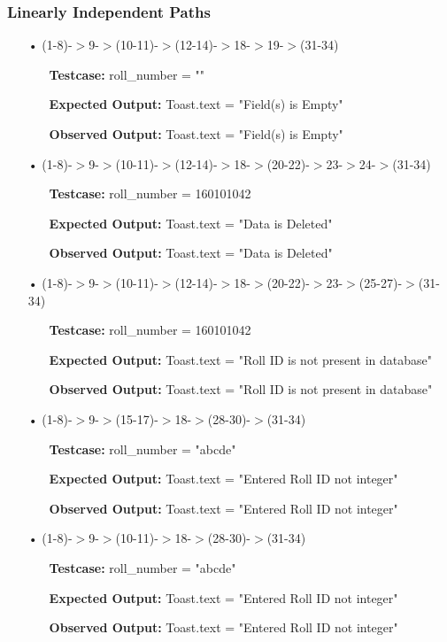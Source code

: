 \documentclass{scrreprt}
\begin{document}
\subsubsection{Linearly Independent Paths}
\begin{enumerate}
\item[•](1-8)-$>$9-$>$(10-11)-$>$(12-14)-$>$18-$>$19-$>$(31-34)
\begin{itemize}
\item[]\textbf{Testcase: }roll_number = ""
\item[]\textbf{Expected Output: }Toast.text = "Field(s) is Empty"
\item[]\textbf{Observed Output: }Toast.text = "Field(s) is Empty"
\end{itemize}

\item[•](1-8)-$>$9-$>$(10-11)-$>$(12-14)-$>$18-$>$(20-22)-$>$23-$>$24-$>$(31-34)
\begin{itemize}
\item[]\textbf{Testcase: }roll_number = 160101042
\item[]\textbf{Expected Output: }Toast.text = "Data is Deleted"
\item[]\textbf{Observed Output: }Toast.text = "Data is Deleted"
\end{itemize}

\item[•](1-8)-$>$9-$>$(10-11)-$>$(12-14)-$>$18-$>$(20-22)-$>$23-$>$(25-27)-$>$(31-34)
\begin{itemize}
\item[]\textbf{Testcase: }roll_number = 160101042
\item[]\textbf{Expected Output: }Toast.text = "Roll ID is not present in database"
\item[]\textbf{Observed Output: }Toast.text = "Roll ID is not present in database"
\end{itemize}

\item[•](1-8)-$>$9-$>$(15-17)-$>$18-$>$(28-30)-$>$(31-34)
\begin{itemize}
\item[]\textbf{Testcase: }roll_number = "abcde"
\item[]\textbf{Expected Output: }Toast.text = "Entered Roll ID not integer"
\item[]\textbf{Observed Output: }Toast.text = "Entered Roll ID not integer"
\end{itemize}

\item[•](1-8)-$>$9-$>$(10-11)-$>$18-$>$(28-30)-$>$(31-34)
\begin{itemize}
\item[]\textbf{Testcase: }roll_number = "abcde"
\item[]\textbf{Expected Output: }Toast.text = "Entered Roll ID not integer"
\item[]\textbf{Observed Output: }Toast.text = "Entered Roll ID not integer"
\end{itemize}

\end{enumerate}	
\end{document}

